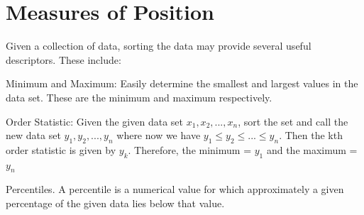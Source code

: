 \documentclass[10pt,]{book}
\theoremstyle{plain}
\theoremstyle{definition}
\theoremstyle{definition}
\numberwithin{equation}{section}
\begin{document}
\section[Measures of Position]{Measures of Position}\label{section-6}
Given a collection of data, sorting the data may provide several useful descriptors. These include:
\par
Minimum and Maximum:  Easily determine the smallest and largest values in the data set. These are the minimum and maximum respectively.%
\par
Order Statistic: Given the given data set \(x_1, x_2, ... , x_n\), sort the set and call the new data set \(y_1, y_2, ..., y_n\) where now we have \( y_1 \le y_2 \le ... \le y_n\). Then the kth order statistic is given by \(y_k\). Therefore, the minimum = \(y_1\) and the maximum = \(y_n\)%
\par
Percentiles. A percentile is a numerical value for which approximately a given percentage of the given data lies below that value.%
\par
\end{document}
